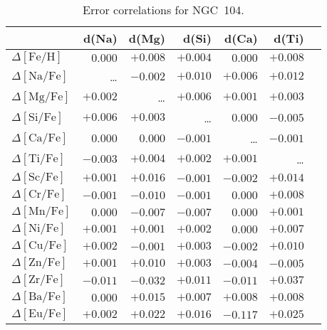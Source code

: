 \documentclass{aa}
\begin{document}
\begin{table}
\caption{Error correlations for NGC~104.}
\label{tab:cerr0104}
\centering
{\small
\begin{tabular}{lrrrrrr}
\hline\hline
  & d(Na) & d(Mg) & d(Si) & d(Ca) & d(Ti)  \\
\hline
$\Delta\mathrm{[Fe/H]}$ &  $0.000$ & $+0.008$ & $+0.004$ & $0.000$ & $+0.008$  \\
$\Delta\mathrm{[Na/Fe]}$ & \ldots & $-0.002$ & $+0.010$ & $+0.006$ & $+0.012$  \\
$\Delta\mathrm{[Mg/Fe]}$ & $+0.002$ & \ldots & $+0.006$ & $+0.001$ & $+0.003$ \\
$\Delta\mathrm{[Si/Fe]}$ & $+0.006$ & $+0.003$ & \ldots & $0.000$ & $-0.005$ \\
$\Delta\mathrm{[Ca/Fe]}$ & $0.000$ & $0.000$ & $-0.001$ & \ldots & $-0.001$  \\
$\Delta\mathrm{[Ti/Fe]}$ & $-0.003$ & $+0.004$ & $+0.002$ & $+0.001$ & \ldots  \\
$\Delta\mathrm{[Sc/Fe]}$ & $+0.001$ & $+0.016$ & $-0.001$ & $-0.002$ & $+0.014$  \\
$\Delta\mathrm{[Cr/Fe]}$ & $-0.001$ & $-0.010$ & $-0.001$ & $0.000$ & $+0.008$  \\
$\Delta\mathrm{[Mn/Fe]}$ & $0.000$ & $-0.007$ & $-0.007$ & $0.000$ & $+0.001$  \\
$\Delta\mathrm{[Ni/Fe]}$ & $+0.001$ & $+0.001$ & $+0.002$ & $0.000$ & $+0.007$  \\
$\Delta\mathrm{[Cu/Fe]}$ & $+0.002$ & $-0.001$ & $+0.003$ & $-0.002$ & $+0.010$  \\
$\Delta\mathrm{[Zn/Fe]}$ & $+0.001$ & $+0.010$ & $+0.003$ & $-0.004$ & $-0.005$  \\
$\Delta\mathrm{[Zr/Fe]}$ & $-0.011$ & $-0.032$ & $+0.011$ & $-0.011$ & $+0.037$  \\
$\Delta\mathrm{[Ba/Fe]}$ & $0.000$ & $+0.015$ & $+0.007$ & $+0.008$ & $+0.008$  \\
$\Delta\mathrm{[Eu/Fe]}$ & $+0.002$ & $+0.022$ & $+0.016$ & $-0.117$ & $+0.025$  \\
\hline
\end{tabular}
}
\end{table}
\end{document}
